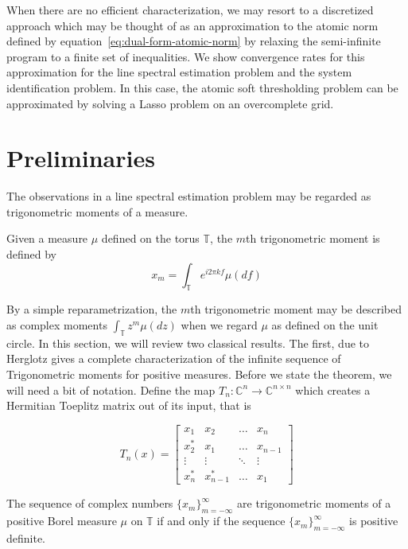 When there are no efficient characterization, we may resort to a discretized
approach which may be thought of as an approximation to the atomic norm defined
by equation~\eqref{eq:dual-form-atomic-norm} by relaxing the semi-infinite
program to a finite set of inequalities. We show convergence rates for this
approximation for the line spectral estimation problem and the system
identification problem. In this case, the atomic soft thresholding problem can
be approximated by solving a Lasso problem on an overcomplete grid.


\section{Preliminaries} %
\label{sec:preliminaries}

The observations in a line spectral estimation problem may be regarded as
trigonometric moments of a measure. 

\begin{definition}
Given a measure $\mu$ defined on the torus $\mathbb{T}$, the $m$th
trigonometric moment is defined by
\begin{equation}
	\label{eq:trig-moment-measure}
	x_m = \int_\mathbb{T} e^{i 2 \pi k f} \mu ( d f)
\end{equation}
\end{definition}

By a simple reparametrization, the $m$th trigonometric moment may be described
as complex moments $\int_\mathbb{T} z^m \mu(dz)$ when we regard $\mu$ as defined
on the unit circle. In this section, we will review two classical results. The
first, due to Herglotz gives a complete characterization of the infinite
sequence of Trigonometric moments for positive measures. Before we state the
theorem, we will need a bit of notation. Define the map $T_n:\mathbb{C}^n
\rightarrow \mathbb{C}^{n\times n}$ which creates a Hermitian Toeplitz matrix
out of its input, that is

\[
T_n(x)= \left[
\begin{array}{ccccc} x_1 & x_2 & \ldots & x_n\\ 
x^*_2 & x_1  & \ldots & x_{n-1}\\
 \vdots & \vdots & \ddots & \vdots\\
 x^*_n & x^*_{n-1}  & \ldots & x_1
 \end{array}\right]
\]


\begin{theorem}\label{thm:herglotz}
	The sequence of complex numbers $\{x_m\}_{m=-\infty}^{\infty}$ are
trigonometric moments of a positive Borel measure $\mu$ on $\mathbb{T}$ if and
only if the sequence $\{x_m\}_{m=-\infty}^{\infty}$ is positive definite.
\end{theorem}


